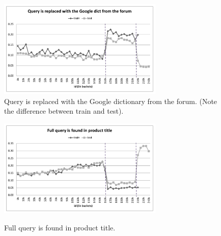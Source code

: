 \documentclass[12pt]{article}
\begin{document}
\begin{appendices}
\begin{figure}
  \centering
  \includegraphics[width=0.7\textwidth]{../Fig/plot_replaced_with_Google.pdf}\\
  \caption{Query is replaced with the Google dictionary from the forum. (Note the difference between train and test).}
  \label{Fig:replaced_with_Google}
\includegraphics[width=0.7\textwidth]{../Fig/plot_full_query_in_title.pdf}\\
  \caption{Full query is found in product title.}
  \label{Fig:full_query_in_title}
\end{figure}


\end{appendices}
\end{document}
